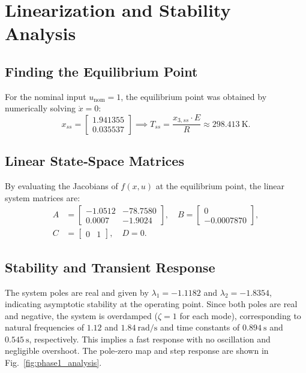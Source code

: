 \documentclass[12pt,a4paper]{article}
\begin{document}
\section{Linearization and Stability Analysis}
\subsection{Finding the Equilibrium Point}
For the nominal input $u_{\text{nom}}=1$, the equilibrium point was obtained by numerically solving $\dot{x}=0$:
\[
x_{ss} = \begin{bmatrix} 1.941355 \\ 0.035537 \end{bmatrix} \implies T_{ss} = \frac{x_{3,ss} \cdot E}{R} \approx 298.413\ \text{K}.
\]

\subsection{Linear State‑Space Matrices}
By evaluating the Jacobians of $f(x,u)$ at the equilibrium point, the linear system matrices are:
\begin{align*}
A &= \begin{bmatrix} -1.0512 & -78.7580 \\ 0.0007 & -1.9024 \end{bmatrix}, \quad
B = \begin{bmatrix} 0 \\ -0.0007870 \end{bmatrix},\\
C &= \begin{bmatrix} 0 & 1 \end{bmatrix}, \quad D = 0.
\end{align*}

\subsection{Stability and Transient Response}
The system poles are real and given by $\lambda_1 = -1.1182$ and $\lambda_2 = -1.8354$, indicating asymptotic stability at the operating point. Since both poles are real and negative, the system is overdamped ($\zeta = 1$ for each mode), corresponding to natural frequencies of $1.12$ and $1.84\ \text{rad/s}$ and time constants of $0.894\ \text{s}$ and $0.545\ \text{s}$, respectively. This implies a fast response with no oscillation and negligible overshoot. The pole‑zero map and step response are shown in Fig.~\ref{fig:phase1_analysis}.
\end{document}
